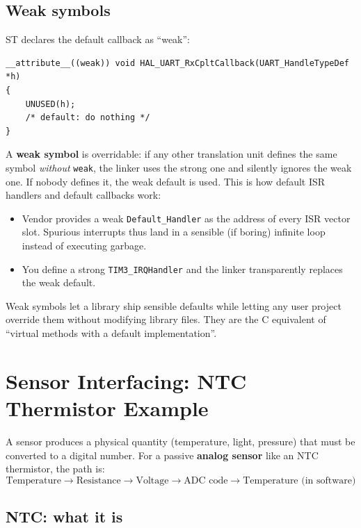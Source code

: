 \documentclass[11pt,a4paper]{article}
\begin{document}
\subsection{Weak symbols}

ST declares the default callback as ``weak'':
\begin{lstlisting}[style=C]
__attribute__((weak)) void HAL_UART_RxCpltCallback(UART_HandleTypeDef *h)
{
    UNUSED(h);
    /* default: do nothing */
}
\end{lstlisting}

A \textbf{weak symbol} is overridable: if any other translation unit defines
the same symbol \emph{without} \texttt{weak}, the linker uses the strong one
and silently ignores the weak one. If nobody defines it, the weak default
is used. This is how default ISR handlers and default callbacks work:
\begin{itemize}[leftmargin=*]
    \item Vendor provides a weak \texttt{Default\_Handler} as the address of
    every ISR vector slot. Spurious interrupts thus land in a sensible (if
    boring) infinite loop instead of executing garbage.
    \item You define a strong \texttt{TIM3\_IRQHandler} and the linker
    transparently replaces the weak default.
\end{itemize}

\begin{keyidea}
Weak symbols let a library ship sensible defaults while letting any user
project override them without modifying library files. They are the C
equivalent of ``virtual methods with a default implementation''.
\end{keyidea}

\section{Sensor Interfacing: NTC Thermistor Example}

A sensor produces a physical quantity (temperature, light, pressure) that
must be converted to a digital number. For a passive \textbf{analog sensor}
like an NTC thermistor, the path is:
\[
\text{Temperature} \longrightarrow \text{Resistance}
\longrightarrow \text{Voltage} \longrightarrow \text{ADC code}
\longrightarrow \text{Temperature (in software)}
\]

\subsection{NTC: what it is}
\end{document}
